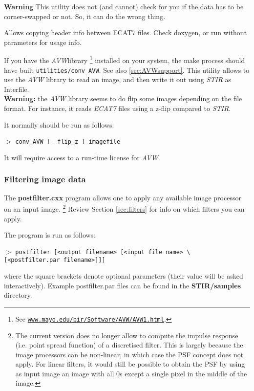 \documentclass{article}
\def\R2Lurl#1#2{\mbox{\href{#1}{\tt #2}}}
\newcommand{\cmdline}[1]{\par \noindent $>$ \texttt{#1}\par}
\begin{document}
\textbf{Warning} This utility does not (and cannot) check for you 
if the data has to be corner-swapped or not. So, it can do the 
wrong thing.

{ 
}
Allows copying header info between ECAT7 files. Check doxygen, or run without 
parameters for usage info.

{ 
}

\label{sec:convAVW}
If you have the \textit{AVW}\texttrademark  library
\footnote{See \R2Lurl{http://www.mayo.edu/bir/Software/AVW/AVW1.html}
{www.mayo.edu/bir/Software/AVW/AVW1.html}.
} installed on your system, the make process should have built \texttt{utilities/conv\_AVW}.
See also \ref{sec:AVWsupport}.
This utility allows to use the \textit{AVW} library to read an image, and then write it out
using \textit{STIR} as Interfile.\\
\textbf{Warning:} the \textit{AVW} library seems to do flip some images depending
on the file format. For instance, it reads \textit{ECAT7} files using a z-flip compared
to \textit{STIR}.

It normally should be run as follows:
\cmdline{conv\_AVW [ --flip\_z ] imagefile}

It will require access to a run-time license for \textit{AVW}.


\subsubsection{
Filtering image data}

The \textbf{postfilter.cxx} program allows one to apply any available 
image processor on an input image. \footnote{{\small The current version 
does no longer allow to compute the impulse response (i.e. point 
spread function) of a discretised filter. This is largely because 
the image processors can be non-linear, in which case the PSF 
concept does not apply. For linear filters, it would still be 
possible to obtain the PSF by using as input image an image with 
all 0s except a single pixel in the middle of the image.}} Review 
Section \ref{sec:filters} for info on which filters you can apply.


The program is run as follows:
\cmdline{postfilter [\texttt{<}output filename\texttt{>} [\texttt{<}input file 
name\texttt{>} {\textbackslash}\\
{[}\texttt{<}postfilter.par filename\texttt{>}]]]}


where the square brackets denote optional parameters (their value 
will be asked interactively). Example postfilter.par files can 
be found in the \textbf{STIR/samples} directory.
\end{document}
